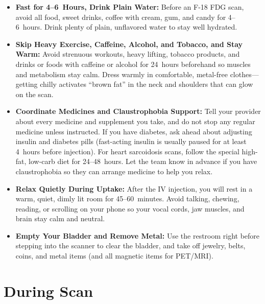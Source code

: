 \begin{itemize}
    \item \textbf{Fast for 4--6~Hours, Drink Plain Water:} Before an F-18 FDG scan, avoid all food, sweet drinks, coffee with cream, gum, and candy for 4--6~hours. Drink plenty of plain, unflavored water to stay well hydrated.
    \item \textbf{Skip Heavy Exercise, Caffeine, Alcohol, and Tobacco, and Stay Warm:} Avoid strenuous workouts, heavy lifting, tobacco products, and drinks or foods with caffeine or alcohol for 24~hours beforehand so muscles and metabolism stay calm. Dress warmly in comfortable, metal-free clothes---getting chilly activates ``brown fat'' in the neck and shoulders that can glow on the scan.
    \item \textbf{Coordinate Medicines and Claustrophobia Support:} Tell your provider about every medicine and supplement you take, and do not stop any regular medicine unless instructed. If you have diabetes, ask ahead about adjusting insulin and diabetes pills (fast-acting insulin is usually paused for at least 4~hours before injection). For heart sarcoidosis scans, follow the special high-fat, low-carb diet for 24--48~hours. Let the team know in advance if you have claustrophobia so they can arrange medicine to help you relax.
    \item \textbf{Relax Quietly During Uptake:} After the IV injection, you will rest in a warm, quiet, dimly lit room for 45--60~minutes. Avoid talking, chewing, reading, or scrolling on your phone so your vocal cords, jaw muscles, and brain stay calm and neutral.
    \item \textbf{Empty Your Bladder and Remove Metal:} Use the restroom right before stepping into the scanner to clear the bladder, and take off jewelry, belts, coins, and metal items (and all magnetic items for PET/MRI).
\end{itemize}

\section{During Scan}

